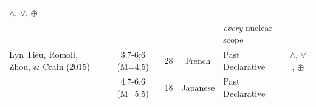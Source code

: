 \documentclass[oneside]{report}
\theoremstyle{definition}
\theoremstyle{definition}
\theoremstyle{definition}
\theoremstyle{remark}
\begin{document}
\begin{longtable}[]{@{}lccclc@{}}
\begin{minipage}[t]{0.13\columnwidth}
\(\land\), \(\lor\), \(\oplus\)\strut
\end{minipage}\tabularnewline
\begin{minipage}[t]{0.23\columnwidth}\raggedright\strut
\strut
\end{minipage} & \begin{minipage}[t]{0.07\columnwidth}\centering\strut
\strut
\end{minipage} & \begin{minipage}[t]{0.05\columnwidth}\centering\strut
\strut
\end{minipage} & \begin{minipage}[t]{0.10\columnwidth}\centering\strut
\strut
\end{minipage} & \begin{minipage}[t]{0.25\columnwidth}\raggedright\strut
\emph{every} nuclear scope\strut
\end{minipage} & \begin{minipage}[t]{0.13\columnwidth}\centering\strut
\strut
\end{minipage}\tabularnewline
\begin{minipage}[t]{0.23\columnwidth}\raggedright\strut
Lyn Tieu, Romoli, Zhou, \& Crain (2015)\strut
\end{minipage} & \begin{minipage}[t]{0.07\columnwidth}\centering\strut
3;7-6;6 (M=4;5)\strut
\end{minipage} & \begin{minipage}[t]{0.05\columnwidth}\centering\strut
28\strut
\end{minipage} & \begin{minipage}[t]{0.10\columnwidth}\centering\strut
French\strut
\end{minipage} & \begin{minipage}[t]{0.25\columnwidth}\raggedright\strut
Past Declarative\strut
\end{minipage} & \begin{minipage}[t]{0.13\columnwidth}\centering\strut
\(\land\), \(\lor\), \(\oplus\)\strut
\end{minipage}\tabularnewline
\begin{minipage}[t]{0.23\columnwidth}\raggedright\strut
\strut
\end{minipage} & \begin{minipage}[t]{0.07\columnwidth}\centering\strut
4;7-6;6 (M=5;5)\strut
\end{minipage} & \begin{minipage}[t]{0.05\columnwidth}\centering\strut
18\strut
\end{minipage} & \begin{minipage}[t]{0.10\columnwidth}\centering\strut
Japanese\strut
\end{minipage} & \begin{minipage}[t]{0.25\columnwidth}\raggedright\strut
Past Declarative\strut
\end{minipage} & \begin{minipage}[t]{0.13\columnwidth}\centering\strut
\strut
\end{minipage}\tabularnewline
\bottomrule
\end{longtable}
\end{document}
